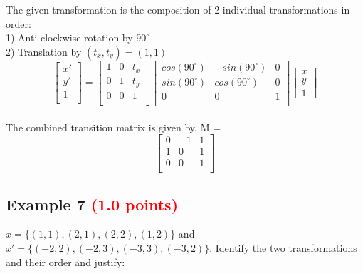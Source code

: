 \documentclass[answers]{exam}
\newcommand{\mypoints}[1]{\textcolor{red}{(#1 points)}}
\begin{document}
\begin{solution}
The given transformation is the composition of 2 individual transformations in order:\\
1) Anti-clockwise rotation by $90^{\circ}$\\
2) Translation by $(t_x, t_y) = (1, 1)$\\
$$
\begin{bmatrix} 
x'\\
y'\\
1\\
\end{bmatrix}
=
\begin{bmatrix}
1 & 0 & t_x\\
0 & 1 & t_y\\
0 & 0 & 1\\
\end{bmatrix}
\begin{bmatrix}
cos(90^{\circ}) & -sin(90^{\circ}) & 0\\
sin(90^{\circ}) & cos(90^{\circ}) & 0\\
0 & 0 & 1\\
\end{bmatrix}
\begin{bmatrix}
x\\
y\\
1
\end{bmatrix}
$$\\
The combined transition matrix is given by, M =\\
$$
\begin{bmatrix}
0 & -1 & 1\\
1 & 0 & 1\\
0 & 0 & 1\\
\end{bmatrix}$$

\end{solution}

\subsection{Example 7 \mypoints{1.0}}
$x = \{(1,1), (2,1), (2,2), (1,2)\}$ and $x' = \{(-2,2), (-2,3), (-3,3), (-3,2)\}$. Identify the two transformations and their order and justify:
\end{document}
